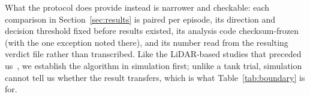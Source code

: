 \documentclass[review]{elsarticle}
\begin{document}
What the protocol does provide instead is narrower and checkable: each comparison
in Section~\ref{sec:results} is paired per episode, its direction and decision
threshold fixed before results existed, its analysis code checksum-frozen (with the
one exception noted there), and its number read from the resulting verdict file
rather than transcribed. Like the LiDAR-based studies that preceded
us~\citep{desmars2020, desmars2023jfm}, we establish the algorithm in simulation
first; unlike a tank trial, simulation cannot tell us whether the result transfers,
which is what Table~\ref{tab:boundary} is for.
% 
\end{document}
